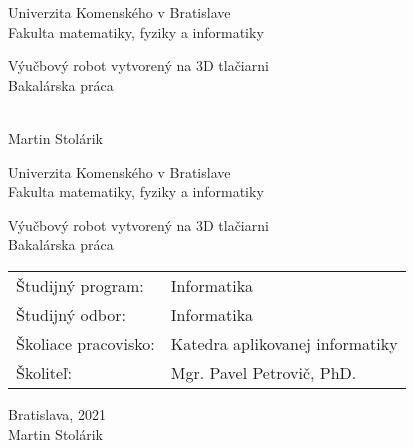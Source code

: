 \documentclass[12pt, twoside]{book}
\def\mfrok{2021}
\def\mfnazov{Výučbový robot vytvorený na 3D tlačiarni}
\def\mftyp{Bakalárska práca}
\def\mfautor{Martin Stolárik}
\def\mfskolitel{Mgr. Pavel Petrovič, PhD.}
\def\mfkonzultant{tit. Meno Priezvisko, tit. }
\def\mfmiesto{Bratislava, \mfrok}
\def\mfodbor{ Informatika}
\def\program{ Informatika }
\def\mfpracovisko{ Katedra aplikovanej informatiky }
\begin{document}
\frontmatter
\lstset{language=Java}
\lstset{basicstyle=\small}

\thispagestyle{empty}

\begin{center}
\sc\large
Univerzita Komenského v Bratislave\\
Fakulta matematiky, fyziky a informatiky

\vfill

{\LARGE\mfnazov}\\
\mftyp
\end{center}

\vfill

{\sc\large 
\noindent \mfrok\\
\mfautor
}

\cleardoublepage


\thispagestyle{empty}
\noindent

\begin{center}
\sc  
\large
Univerzita Komenského v Bratislave\\
Fakulta matematiky, fyziky a informatiky

\vfill

{\LARGE\mfnazov}\\
\mftyp
\end{center}

\vfill

\noindent
\begin{tabular}{ll}
Študijný program: & \program \\
Študijný odbor: & \mfodbor \\
Školiace pracovisko: & \mfpracovisko \\
Školiteľ: & \mfskolitel \\
\end{tabular}

\vfill


\noindent \mfmiesto\\
\mfautor

\cleardoublepage


\end{document}
